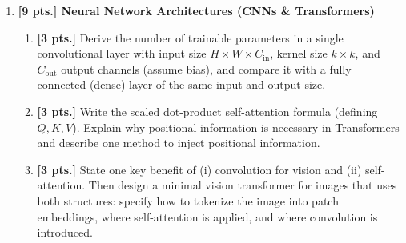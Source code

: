\documentclass[11pt,a4paper]{article}
\begin{document}
\begin{enumerate}[label=\textbf{\arabic*.}]
    \item \textbf{[9 pts.] Neural Network Architectures (CNNs \& Transformers)}
    \begin{enumerate}[label=(\a*)]
        \item \textbf{[3 pts.]} Derive the number of trainable parameters in a single convolutional layer with input size $H \times W \times C_{\text{in}}$, kernel size $k \times k$, and $C_{\text{out}}$ output channels (assume bias), and compare it with a fully connected (dense) layer of the same input and output size.
        \item \textbf{[3 pts.]} Write the scaled dot-product self-attention formula (defining $Q, K, V$). Explain why positional information is necessary in Transformers and describe one method to inject positional information.
        \item \textbf{[3 pts.]} State one key benefit of (i) convolution for vision and (ii) self-attention. Then design a minimal vision transformer for images that uses both structures: specify how to tokenize the image into patch embeddings, where self-attention is applied, and where convolution is introduced.
    \end{enumerate}


\end{enumerate}
\end{document}
